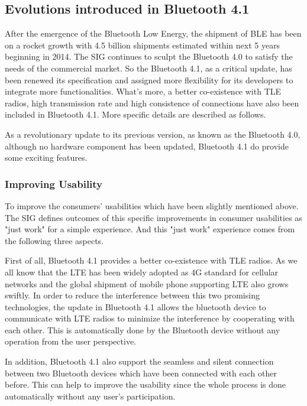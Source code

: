 \documentclass{cseminar}
\begin{document}
\subsection{Evolutions introduced in Bluetooth 4.1}
After the emergence of the Bluetooth Low Energy, the shipment of BLE has been on a rocket growth with 4.5 billion shipments estimated within next 5 years beginning in 2014\cite{BLE_2014}. The SIG continues to sculpt the Bluetooth 4.0 to satisfy the needs of the commercial market. So the Bluetooth 4.1, as a critical update, has been renewed its specification and assigned more flexibility for its developers to integrate more functionalities. What's more, a better co-existence with TLE radios, high transmission rate and high consistence of connections have also been included in Bluetooth 4.1. More specific details are described as follows.

As a revolutionary update to its previous version, as known as the Bluetooth 4.0, although no hardware component has been updated, Bluetooth 4.1 do provide some exciting features.
\subsubsection{Improving Usability}
To improve the consumers' usabilities which have been slightly mentioned above. The SIG defines outcomes of this specific improvements in consumer usabilities as "just work" for a simple experience. And this "just work" experience comes from the following three aspects.

First of all, Bluetooth 4.1 provides a better co-existence with TLE radios. As we all know that the LTE has been widely adopted as 4G standard for cellular networks and the global shipment of mobile phone supporting LTE also grows swiftly. In order to reduce the interference between this two promising technologies, the update in Bluetooth 4.1 allows the bluetooth device to communicate with LTE radios to minimize the interference by cooperating with each other. This is automatically done by the Bluetooth device without any operation from the user perspective.

In addition, Bluetooth 4.1 also support the seamless and silent connection between two Bluetooth devices which have been connected with each other before. This can help to improve the usability since the whole process is done automatically without any user's participation.
\end{document}
